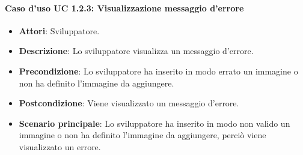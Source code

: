 \paragraph{Caso d'uso UC 1.2.3: Visualizzazione messaggio d'errore}

\FloatBarrier
\begin{itemize}
\item\textbf{Attori}: Sviluppatore.
\item\textbf{Descrizione}: Lo sviluppatore visualizza un messaggio d'errore.
\item\textbf{Precondizione}: Lo sviluppatore ha inserito in modo errato un immagine o non ha definito l'immagine da aggiungere.
\item\textbf{Postcondizione}: Viene visualizzato un messaggio d'errore.
\item\textbf{Scenario principale}: Lo sviluppatore ha inserito in modo non valido un immagine o non ha definito l'immagine da aggiungere, perciò viene visualizzato un errore.
\end{itemize}
